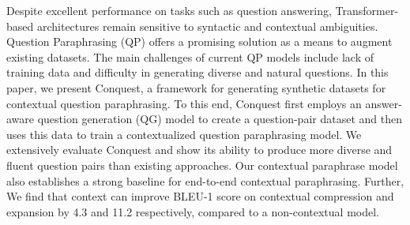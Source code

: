 Despite excellent performance on tasks such as question answering, Transformer-based architectures remain sensitive to syntactic and contextual ambiguities. Question Paraphrasing (QP) offers a promising solution as a means to augment existing datasets. The main challenges of current QP models include lack of training data and difficulty in generating diverse and natural questions. In this paper, we present Conquest, a framework for generating synthetic datasets for contextual question paraphrasing. To this end, Conquest first employs an answer-aware question generation (QG) model to create a question-pair dataset and then uses this data to train a contextualized question paraphrasing model. We extensively evaluate Conquest and show its ability to produce more diverse and fluent question pairs than existing approaches. Our contextual paraphrase model also establishes a strong baseline for end-to-end contextual paraphrasing. Further, We find that context can improve BLEU-1 score on contextual compression and expansion by 4.3 and 11.2 respectively, compared to a non-contextual model.
